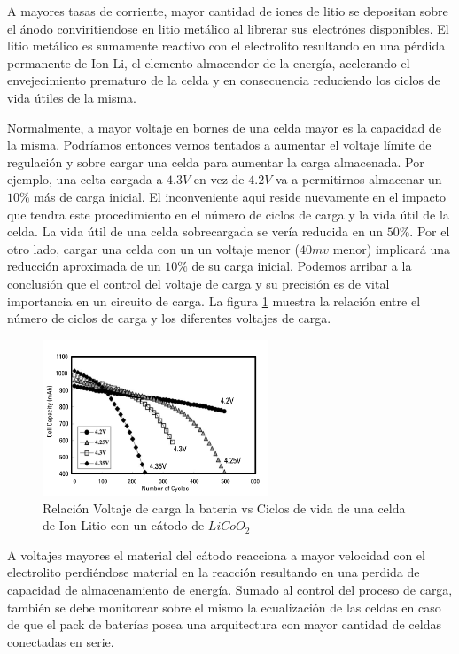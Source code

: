 \documentclass[10pt,a4paper]{article}
\begin{document}
A mayores tasas de corriente, mayor cantidad de iones de litio se depositan
sobre el ánodo conviritiendose en litio metálico al librerar sus electrónes
disponibles.  El litio metálico es sumamente reactivo con el electrolito
resultando en una pérdida permanente de \acrshort{Ion-Li}, el elemento
almacendor de la energía, acelerando el envejecimiento prematuro de la celda y
en consecuencia reduciendo los ciclos de vida útiles de la misma. 

Normalmente, a mayor voltaje en bornes de una celda mayor es la capacidad de la
misma. Podríamos entonces vernos tentados a aumentar el voltaje límite de
regulación y sobre cargar una celda para aumentar la carga almacenada. Por
ejemplo, una celta cargada a $4.3V$ en vez de $4.2V$ va a permitirnos almacenar
un $10\%$ más de carga inicial. El inconveniente aqui reside nuevamente en el
impacto que tendra este procedimiento en el número de ciclos de carga y la vida
útil de la celda. La vida útil de una celda sobrecargada se vería reducida en
un $50\%$.  Por el otro lado, cargar una celda con un un voltaje menor ($40mv$
menor) implicará una reducción aproximada de un $10\%$ de su carga inicial.
Podemos arribar a la conclusión que el control del voltaje de carga y su
precisión es de vital importancia en un circuito de carga. La figura
\ref{fig:C_vs_Cycle_V} muestra la relación entre el número de ciclos de carga y
los diferentes voltajes de carga. 

\begin{figure}[h!] \centering
    \includegraphics[width=0.6\textwidth]{bat_char/C_vs_Cycle_V.png}
    \caption{Relación Voltaje de carga la bateria vs Ciclos de vida de una celda de
Ion-Litio con un cátodo de $LiCoO_2$} \label{fig:C_vs_Cycle_V} \end{figure}
\FloatBarrier

A voltajes mayores el material del cátodo reacciona a mayor velocidad con el
electrolito perdiéndose material en la reacción resultando en una perdida de
capacidad de almacenamiento de energía. Sumado al control del proceso de carga,
tambi\'en se debe monitorear sobre el mismo la ecualizaci\'on de las celdas en
caso de que el pack de bater\'ias posea una arquitectura con mayor cantidad de
celdas conectadas en serie.
\end{document}
